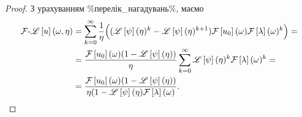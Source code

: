 \begin{proof}
    З урахуванням \%перелік\_нагадувань\%, маємо
    \begin{equation}
        \begin{aligned}
            \mathcal{F}\text{-}\mathscr{L}\left[u\right](\omega, \eta) 
            &= \sum_{k = 0}^\infty \frac{1}{\eta} \Big( (\mathscr{L}\left[\psi\right](\eta)^k - \mathscr{L}\left[\psi\right](\eta)^{k + 1}) \mathcal{F}\left[u_0\right](\omega) \mathcal{F}\left[\lambda\right](\omega)^k \Big) = \\
            &= \frac{\mathcal{F}\left[u_0\right](\omega) (1 - \mathscr{L}\left[\psi\right](\eta))}{\eta} \sum_{k = 0}^\infty \mathscr{L}\left[\psi\right](\eta)^{k} \mathcal{F}\left[\lambda\right](\omega)^k = \\
            &= \frac{\mathcal{F}\left[u_0\right](\omega) (1 - \mathscr{L}\left[\psi\right](\eta))}{\eta (1 - \mathscr{L}\left[\psi\right](\eta) \mathcal{F}\left[\lambda\right](\omega)}.
        \end{aligned}
    \end{equation}
\end{proof}
